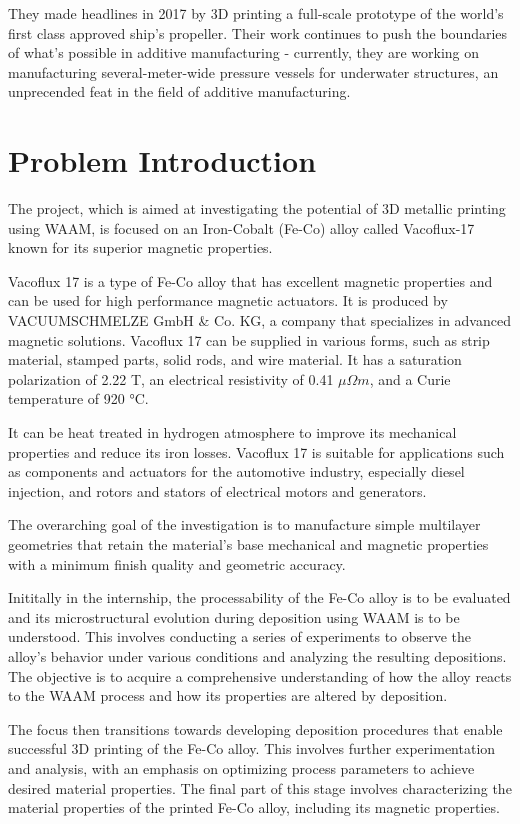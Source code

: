 They made headlines in 2017 by 3D printing a full-scale prototype of the world's first class approved ship's propeller. Their work continues to push the boundaries of what's possible in additive manufacturing - currently, they are working on manufacturing several-meter-wide pressure vessels for underwater structures, an unprecended feat in the field of additive manufacturing.


\section{Problem Introduction}

The project, which is aimed at investigating the potential of 3D metallic printing using WAAM, is focused on an Iron-Cobalt (Fe-Co) alloy called Vacoflux-17 known for its superior magnetic properties.

Vacoflux 17 is a type of Fe-Co alloy that has excellent magnetic properties and can be used for high performance magnetic actuators. It is produced by VACUUMSCHMELZE GmbH \& Co. KG, a company that specializes in advanced magnetic solutions.
Vacoflux 17 can be supplied in various forms, such as strip material, stamped parts, solid rods, and wire material. It has a saturation polarization of 2.22 T, an electrical resistivity of 0.41 $\mu \Omega m$, and a Curie temperature of 920 °C.

It can be heat treated in hydrogen atmosphere to improve its mechanical properties and reduce its iron losses. Vacoflux 17 is suitable for applications such as components and actuators for the automotive industry, especially diesel injection, and rotors and stators of electrical motors and generators.

The overarching goal of the investigation is to manufacture simple multilayer geometries that retain the material's base mechanical and magnetic properties with a minimum finish quality and geometric accuracy.

Inititally in the internship, the processability of the Fe-Co alloy is to be evaluated and its microstructural evolution during deposition using WAAM is to be understood. This involves conducting a series of experiments to observe the alloy's behavior under various conditions and analyzing the resulting depositions. The objective is to acquire a comprehensive understanding of how the alloy reacts to the WAAM process and how its properties are altered by deposition.

The focus then transitions towards developing deposition procedures that enable successful 3D printing of the Fe-Co alloy. This involves further experimentation and analysis, with an emphasis on optimizing process parameters to achieve desired material properties. The final part of this stage involves characterizing the material properties of the printed Fe-Co alloy, including its magnetic properties.


